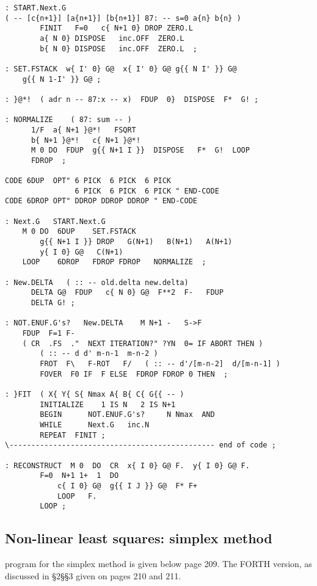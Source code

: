 \begin{lstlisting}
: START.Next.G
( -- [c{n+1}] [a{n+1}] [b{n+1}] 87: -- s=0 a{n} b{n} )
        FINIT   F=0   c{ N+1 0} DROP ZERO.L
        a{ N 0} DISPOSE   inc.OFF  ZERO.L
        b{ N 0} DISPOSE   inc.OFF  ZERO.L  ;

: SET.FSTACK  w{ I' 0} G@  x{ I' 0} G@ g{{ N I' }} G@
    g{{ N 1-I' }} G@ ;

: }@*!  ( adr n -- 87:x -- x)  FDUP  0}  DISPOSE  F*  G! ;

: NORMALIZE    ( 87: sum -- )  
      1/F  a{ N+1 }@*!   FSQRT
      b{ N+1 }@*!   c{ N+1 }@*!
      M 0 DO  FDUP  g{{ N+1 I }}  DISPOSE   F*  G!  LOOP
      FDROP  ;

CODE 6DUP  OPT" 6 PICK  6 PICK  6 PICK
                6 PICK  6 PICK  6 PICK " END-CODE
CODE 6DROP OPT" DDROP DDROP DDROP " END-CODE

: Next.G   START.Next.G 
    M 0 DO  6DUP    SET.FSTACK
        g{{ N+1 I }} DROP   G(N+1)   B(N+1)   A(N+1)
        y{ I 0} G@   C(N+1)
    LOOP    6DROP   FDROP FDROP   NORMALIZE  ;

: New.DELTA   ( :: -- old.delta new.delta)
      DELTA G@  FDUP   c{ N 0} G@  F**2  F-   FDUP
      DELTA G! ;

: NOT.ENUF.G's?   New.DELTA    M N+1 -   S->F
    FDUP  F=1 F- 
    ( CR  .FS  ."  NEXT ITERATION?" ?YN  0= IF ABORT THEN )
        ( :: -- d d' m-n-1  m-n-2 )  
        FROT  F\   F-ROT   F/   ( :: -- d'/[m-n-2]  d/[m-n-1] )
        FOVER  F0 IF  F ELSE  FDROP FDROP 0 THEN  ;

: }FIT  ( X{ Y{ S{ Nmax A{ B{ C{ G{{ -- )
        INITIALIZE    1 IS N   2 IS N+1
        BEGIN      NOT.ENUF.G's?     N Nmax  AND 
        WHILE      Next.G   inc.N
        REPEAT  FINIT ;
\----------------------------------------------- end of code ;

: RECONSTRUCT  M 0  DO  CR  x{ I 0} G@ F.  y{ I 0} G@ F. 
        F=0  N+1 1+  1  DO 
            c{ I 0} G@  g{{ I J }} G@  F* F+ 
            LOOP   F. 
        LOOP ;
\end{lstlisting}

\subsection{Non-linear least squares: simplex method}
 program for the simplex method is given below page 209. The FORTH version, as discussed in \S2\S\S3 given on pages 210 and 211.

